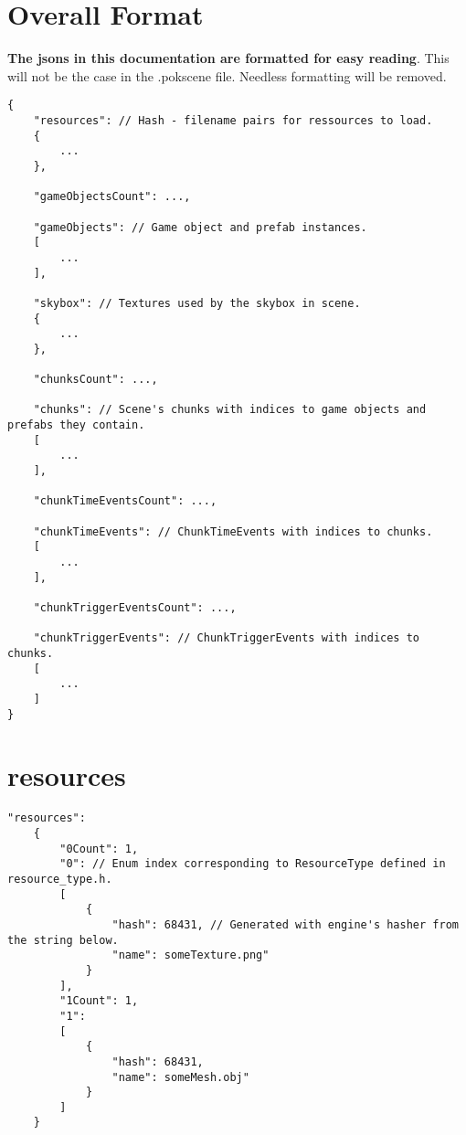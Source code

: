 \documentclass[10pt,a4paper]{article}
\begin{document}
\section{Overall Format}
\textbf{The jsons in this documentation are formatted for easy reading}. This will not be the case in the .pokscene file. Needless formatting will be removed.
\begin{lstlisting}
{
	"resources": // Hash - filename pairs for ressources to load.
	{
		...	
	},
	
	"gameObjectsCount": ...,
	
	"gameObjects": // Game object and prefab instances.
	[
		...	
	],
	
	"skybox": // Textures used by the skybox in scene.
	{
		...	
	},
	
	"chunksCount": ...,
	
	"chunks": // Scene's chunks with indices to game objects and prefabs they contain.
	[
		...	
	],
	
	"chunkTimeEventsCount": ...,
	
	"chunkTimeEvents": // ChunkTimeEvents with indices to chunks.
	[
		...	
	],
	
	"chunkTriggerEventsCount": ...,
	
	"chunkTriggerEvents": // ChunkTriggerEvents with indices to chunks.
	[
		...	
	]
}
\end{lstlisting}

\newpage

\section{resources}
\begin{lstlisting}
"resources":
	{
		"0Count": 1,
		"0": // Enum index corresponding to ResourceType defined in resource_type.h.
		[
			{
				"hash": 68431, // Generated with engine's hasher from the string below.
				"name": someTexture.png"
			}		
		],
		"1Count": 1,
		"1": 
		[
			{
				"hash": 68431,
				"name": someMesh.obj"		
			}		
		]
	}
\end{lstlisting}

\newpage
\end{document}

